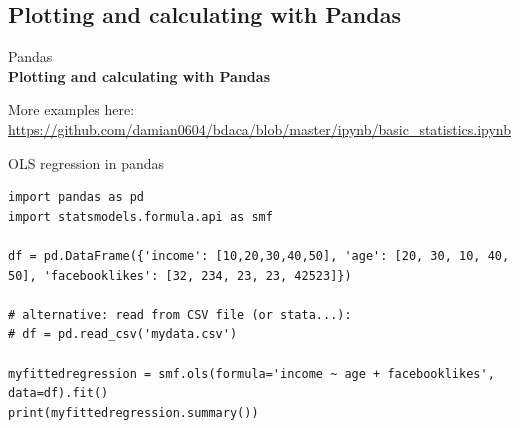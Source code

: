 \documentclass{beamer}
\begin{document}
\subsection{Plotting and calculating with Pandas}
\begin{frame}[plain]
	Pandas\\
	\textbf{Plotting and calculating with Pandas}
\end{frame}


\begin{frame}{}

More examples here: \url{https://github.com/damian0604/bdaca/blob/master/ipynb/basic_statistics.ipynb}
\end{frame}


\begin{frame}[fragile]{OLS regression in pandas}
\begin{lstlisting}
import pandas as pd
import statsmodels.formula.api as smf 

df = pd.DataFrame({'income': [10,20,30,40,50], 'age': [20, 30, 10, 40, 50], 'facebooklikes': [32, 234, 23, 23, 42523]})

# alternative: read from CSV file (or stata...):
# df = pd.read_csv('mydata.csv')

myfittedregression = smf.ols(formula='income ~ age + facebooklikes', data=df).fit()
print(myfittedregression.summary())
\end{lstlisting}
	
\end{frame}
\end{document}
